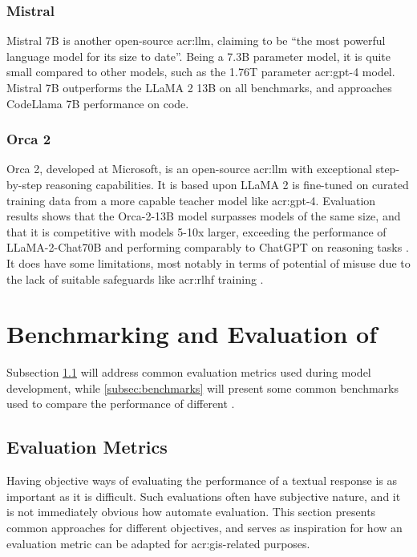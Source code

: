 \subsubsection{Mistral}

Mistral 7B \citep{aiMistral7B2023} is another open-source \acrshort{acr:llm}, claiming to be \enquote{the most powerful language model for its size to date}. Being a 7.3B parameter model, it is quite small compared to other models, such as the 1.76T parameter \acrshort{acr:gpt}-4 model. Mistral 7B outperforms the LLaMA 2 13B on all benchmarks, and approaches CodeLlama 7B performance on code.

\subsubsection{Orca 2}

Orca 2, developed at Microsoft, is an open-source \acrshort{acr:llm} with exceptional step-by-step reasoning capabilities. It is based upon LLaMA 2 is fine-tuned on curated training data from a more capable teacher model like \acrshort{acr:gpt}-4. Evaluation results shows that the Orca-2-13B model surpasses models of the same size, and that it is competitive with models 5-10x larger, exceeding the performance of LLaMA-2-Chat70B and performing comparably to ChatGPT on reasoning tasks \citep[11-12]{mitraOrcaTeachingSmall2023}. It does have some limitations, most notably in terms of potential of misuse due to the lack of suitable safeguards like \acrshort{acr:rlhf} training \citep[21]{mitraOrcaTeachingSmall2023}.



\section[Benchmarking and Evaluation of LLMs]{Benchmarking and Evaluation of }\label{sec:benchmarking-and-evaluation}

Subsection \ref{subsec:evaluation-metrics} will address common evaluation metrics used during model development, while \autoref{subsec:benchmarks} will present some common benchmarks used to compare the performance of different .

\subsection{Evaluation Metrics}\label{subsec:evaluation-metrics}

Having objective ways of evaluating the performance of a textual response is as important as it is difficult. Such evaluations often have subjective nature, and it is not immediately obvious how automate evaluation. This section presents common approaches for different objectives, and serves as inspiration for how an evaluation metric can be adapted for \acrshort{acr:gis}-related purposes.

